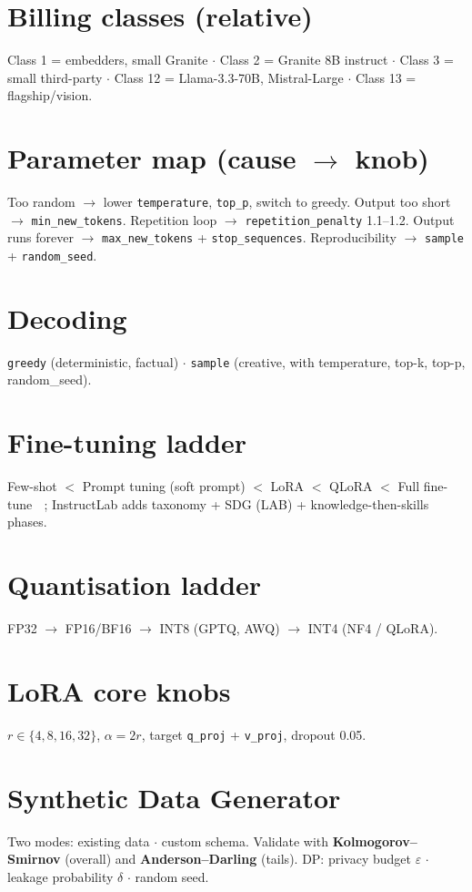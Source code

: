 \section*{Billing classes (relative)}
Class 1 = embedders, small Granite $\cdot$ Class 2 = Granite 8B instruct $\cdot$ Class 3 = small third-party $\cdot$ Class 12 = Llama-3.3-70B, Mistral-Large $\cdot$ Class 13 = flagship/vision.

\section*{Parameter map (cause $\to$ knob)}
Too random $\to$ lower \texttt{temperature}, \texttt{top\_p}, switch to greedy. Output too short $\to$ \texttt{min\_new\_tokens}. Repetition loop $\to$ \texttt{repetition\_penalty} 1.1--1.2. Output runs forever $\to$ \texttt{max\_new\_tokens} + \texttt{stop\_sequences}. Reproducibility $\to$ \texttt{sample} + \texttt{random\_seed}.

\section*{Decoding}
\texttt{greedy} (deterministic, factual) $\cdot$ \texttt{sample} (creative, with temperature, top-k, top-p, random\_seed).

\section*{Fine-tuning ladder}
Few-shot $<$ Prompt tuning (soft prompt) $<$ LoRA $<$ QLoRA $<$ Full fine-tune $\;$ ; InstructLab adds taxonomy + SDG (LAB) + knowledge-then-skills phases.

\section*{Quantisation ladder}
FP32 $\to$ FP16/BF16 $\to$ INT8 (GPTQ, AWQ) $\to$ INT4 (NF4 / QLoRA).

\section*{LoRA core knobs}
$r \in \{4,8,16,32\}$, $\alpha = 2r$, target \texttt{q\_proj} + \texttt{v\_proj}, dropout 0.05.

\section*{Synthetic Data Generator}
Two modes: existing data $\cdot$ custom schema. Validate with \textbf{Kolmogorov--Smirnov} (overall) and \textbf{Anderson--Darling} (tails). DP: privacy budget $\varepsilon$ $\cdot$ leakage probability $\delta$ $\cdot$ random seed.

